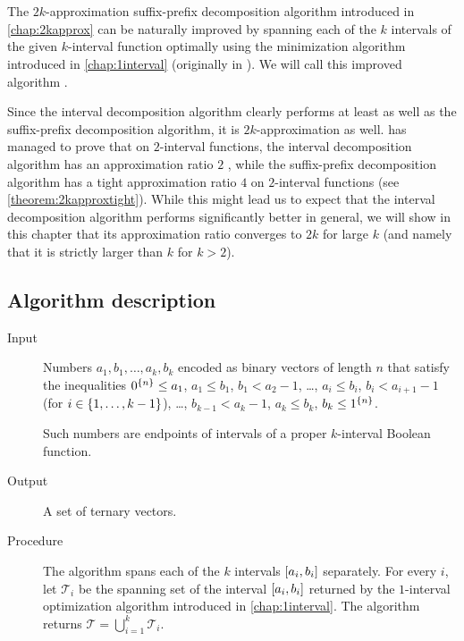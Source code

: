 \chapter{}
\label{chap:betterapprox}

The $2k$-approximation
suffix-prefix decomposition algorithm
introduced in \autoref{chap:2kapprox}
can be naturally improved
by spanning each of the $k$ intervals
of the given $k$-interval function
optimally using the minimization algorithm
introduced in \autoref{chap:1interval}
(originally in \citet{Schieber2005154}).
We will call this improved algorithm
.

Since the interval decomposition algorithm
clearly performs at least as well
as the suffix-prefix decomposition algorithm,
it is $2k$-approximation as well.
\citeauthor{Dubovsky2012} has managed
to prove that on $2$-interval functions,
the interval decomposition algorithm
has an approximation ratio $2$
\citep[p.~39]{Dubovsky2012}, %
while the suffix-prefix decomposition algorithm
has a tight approximation ratio $4$
on $2$-interval functions
(see \autoref{theorem:2kapproxtight}).
While this might lead us to expect
that the interval decomposition algorithm
performs significantly better in general,
we will show in this chapter that its approximation ratio
converges to $2k$ for large $k$
(and namely that it is strictly larger than $k$
for $k > 2$).

\section{Algorithm description}

\begin{description}
\item[Input] Numbers $a_1, b_1, \ldots, a_k, b_k$
encoded as binary vectors of length $n$
that satisfy the inequalities
$0^{\{n\}} \leq a_1$,
$a_1 \leq b_1$,
$b_1 < a_2 - 1$,
\ldots,
$a_i \leq b_i$,
$b_i < a_{i+1} - 1$
(for $i \in \{1, \ldots, k-1\}$),
\ldots,
$b_{k-1} < a_k - 1$,
$a_k \leq b_k$,
$b_k \leq 1^{\{n\}}$.

Such numbers are endpoints of intervals
of a proper $k$-interval Boolean function.

\item[Output] A set of ternary vectors.

\item[Procedure]
The algorithm spans each of the $k$ intervals
$[a_i, b_i]$ separately.
For every $i$,
let $\mathcal{T}_i$ be the spanning set of the interval
$[a_i, b_i]$ returned by the $1$-interval
optimization algorithm
introduced in \autoref{chap:1interval}.
The algorithm returns
$\mathcal{T} = \bigcup_{i=1}^k{\mathcal{T}_i}$.
\end{description}

